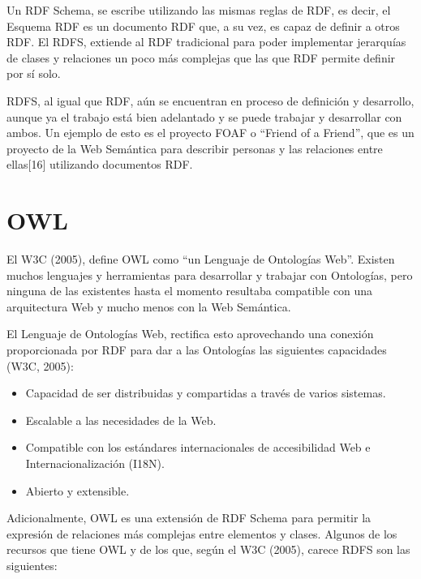Un RDF Schema, se escribe utilizando las mismas reglas de RDF, es decir, el Esquema RDF es un documento RDF que, a su vez, es capaz de definir a otros RDF. El RDFS, extiende al RDF tradicional para poder implementar jerarquías de clases y relaciones un poco más complejas que las que RDF permite definir por sí solo.

RDFS, al igual que RDF, aún se encuentran en proceso de definición y desarrollo, aunque ya el trabajo está bien adelantado y se puede trabajar y desarrollar con ambos. Un ejemplo de esto es el proyecto FOAF o ``Friend of a Friend'', que es un proyecto de la Web Semántica para describir personas y las relaciones entre ellas[16] utilizando documentos RDF.

\section{OWL}

El W3C (2005), define OWL como ``un Lenguaje de Ontologías Web''. Existen muchos lenguajes y herramientas para desarrollar y trabajar con Ontologías, pero ninguna de las existentes hasta el momento resultaba compatible con una arquitectura Web y mucho menos con la Web Semántica. 

El Lenguaje de Ontologías Web, rectifica esto aprovechando una conexión proporcionada por RDF para dar a las Ontologías las siguientes capacidades (W3C, 2005):

\begin{itemize}
\item Capacidad de ser distribuidas y compartidas a través de varios sistemas.
\item Escalable a las necesidades de la Web.
\item Compatible con los estándares internacionales de accesibilidad Web e Internacionalización (I18N).
\item Abierto y extensible.
\end{itemize}

Adicionalmente, OWL es una extensión de RDF Schema para permitir la expresión de relaciones más complejas entre elementos y clases. Algunos de los recursos que tiene OWL y de los que, según el W3C (2005), carece RDFS son las siguientes:

